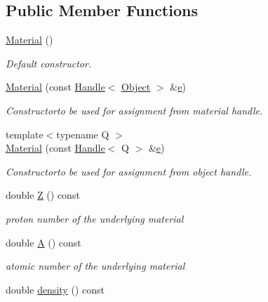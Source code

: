 \subsection*{Public Member Functions}
\begin{DoxyCompactItemize}
\item 
\hyperlink{class_d_d4hep_1_1_geometry_1_1_material_a0af6f273d664a63108c7100913355d98}{Material} ()
\begin{DoxyCompactList}\small\item\em Default constructor. \end{DoxyCompactList}\item 
\hyperlink{class_d_d4hep_1_1_geometry_1_1_material_a33fffc1be75fb353a8df0f982fb05269}{Material} (const \hyperlink{class_d_d4hep_1_1_handle}{Handle}$<$ \hyperlink{class_d_d4hep_1_1_geometry_1_1_material_afdf167b558006f1bf7348fa5e812f4d8}{Object} $>$ \&\hyperlink{_volumes_8cpp_a8a9a1f93e9b09afccaec215310e64142}{e})
\begin{DoxyCompactList}\small\item\em Constructorto be used for assignment from material handle. \end{DoxyCompactList}\item 
{\footnotesize template$<$typename Q $>$ }\\\hyperlink{class_d_d4hep_1_1_geometry_1_1_material_a83bacf08403036fbfb4e5eb32e60944a}{Material} (const \hyperlink{class_d_d4hep_1_1_handle}{Handle}$<$ Q $>$ \&\hyperlink{_volumes_8cpp_a8a9a1f93e9b09afccaec215310e64142}{e})
\begin{DoxyCompactList}\small\item\em Constructorto be used for assignment from object handle. \end{DoxyCompactList}\item 
double \hyperlink{class_d_d4hep_1_1_geometry_1_1_material_a3a1338c2309602b72fd24b42956d3d94}{Z} () const
\begin{DoxyCompactList}\small\item\em proton number of the underlying material \end{DoxyCompactList}\item 
double \hyperlink{class_d_d4hep_1_1_geometry_1_1_material_a48a7eedb2bf1e255252a3d212b29dfd0}{A} () const
\begin{DoxyCompactList}\small\item\em atomic number of the underlying material \end{DoxyCompactList}\item 
double \hyperlink{class_d_d4hep_1_1_geometry_1_1_material_a68cdabad1dae26341a4690de2464ee43}{density} () const

\end{DoxyCompactItemize}
